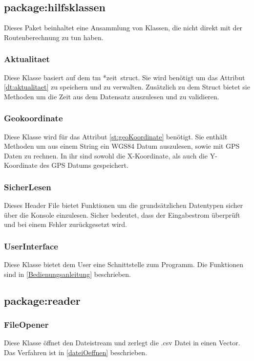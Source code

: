 \documentclass[12pt, a4paper, ngerman]{article}
\begin{document}
\subsection{package:hilfsklassen}
Dieses Paket beinhaltet eine Ansammlung von Klassen, die nicht direkt mit der Routenberechnung zu tun haben.
\subsubsection{Aktualitaet \label{class:Aktualitaet}}
Diese Klasse basiert auf dem \glqq tm *zeit\grqq~struct. Sie wird benötigt um das Attribut \ref{dt:aktualitaet} zu speichern und zu verwalten. Zusätzlich zu dem Struct bietet sie Methoden um die Zeit aus dem Datensatz auszulesen und zu validieren.

\subsubsection{Geokoordinate}
Diese Klasse wird für das Attribut \ref{st:geoKoordinate} benötigt. Sie enthält Methoden um aus einem String ein WGS84 Datum auszulesen, sowie mit GPS Daten zu rechnen. In ihr sind sowohl die X-Koordinate, als auch die Y-Koordinate des GPS Datums gespeichert.

\subsubsection{SicherLesen}
Dieses Header File bietet Funktionen um die grundsätzlichen Datentypen sicher über die Konsole einzulesen. Sicher bedeutet, dass der Eingabestrom überprüft und bei einem Fehler zurückgesetzt wird.


\subsubsection{UserInterface \label{UserInterface}}
Diese Klasse bietet dem User eine Schnittstelle zum Programm. Die Funktionen sind in \ref{Bedienungsanleitung} beschrieben.

\subsection{package:reader}
\subsubsection{FileOpener \label{class:FileOpener}}
Diese Klasse öffnet den Dateistream und zerlegt die .csv Datei in einen Vector. Das Verfahren ist in \ref{dateiOeffnen} beschrieben.
\end{document}
